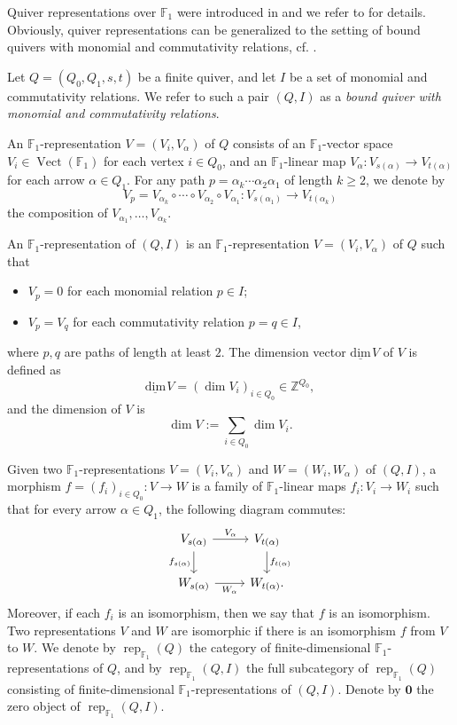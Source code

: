 \documentclass[12pt]{amsart}
\theoremstyle{remark}
\theoremstyle{definition}
\numberwithin{equation}{section}
\newcommand{\dimv}{\underline{\mathrm{dim}}\hspace{1pt}}
\begin{document}
Quiver representations over $\mathbb{F}_1$ were introduced in \cite{Sz12} and we refer to \cite{Sz12} for details. Obviously, quiver representations can be generalized to the setting of bound quivers with monomial and commutativity relations, cf. \cite{TF25}. 

Let $Q=(Q_0,Q_1,s,t)$ be a finite quiver, and let $I$ be a set of monomial and commutativity relations. We refer to such a pair $(Q,I)$ as a {\em bound quiver with monomial and commutativity relations}.

 An $\mathbb{F}_1$-representation
${V}=(V_i,V_\alpha)$
of $Q$ consists of an $\mathbb{F}_1$-vector space $V_i\in \operatorname{Vect} (\mathbb{F}_1)$ for each vertex $i\in Q_0$, and an $\mathbb{F}_1$-linear map
$V_\alpha:V_{s(\alpha)}\to V_{t(\alpha)}$
for each arrow $\alpha\in Q_1$. For any path $p=\alpha_k\cdots \alpha_2\alpha_1$ of length $k\geq 2$, we denote by 
\[
V_p=V_{\alpha_k}\circ\cdots\circ V_{\alpha_2}\circ V_{\alpha_1}:V_{s(\alpha_1)}\to V_{t(\alpha_k)}
\]
the composition of $V_{\alpha_1},\ldots, V_{\alpha_k}$.

 An $\mathbb{F}_1$-representation
of $(Q,I)$ is an $\mathbb{F}_1$-representation ${V}=(V_i,V_\alpha)$ of $Q$
such that
\begin{itemize}
    \item $V_p=0$ for each monomial relation $p\in I$;
    \item $V_p=V_q$ for each commutativity relation $p=q\in I$,
\end{itemize}
where $p,q$ are paths of length at least $2$. The dimension vector $\dimv {V}$ of ${V}$ is defined as
\[
\dimv {V}=(\dim V_i)_{i\in Q_0}\in \mathbb{Z}^{Q_0},
\]
and the dimension of ${V}$ is
\[\dim {V}:=\sum_{i\in Q_0}\dim V_i.\]



Given two $\mathbb{F}_1$-representations ${V}=(V_i,V_\alpha)$ and ${W}=(W_i,W_\alpha)$ of $(Q,I)$, a morphism $f=(f_i)_{i\in Q_0}:{V}\to {W}$ is a family of $\mathbb{F}_1$-linear maps $f_i:V_i\to W_i$ such that for every arrow $\alpha\in Q_1$, the following diagram commutes:
\[
\begin{tikzcd}
V_{s(\alpha)} \arrow[r,"V_\alpha"] \arrow[d,"f_{s(\alpha)}"'] 
& V_{t(\alpha)} \arrow[d,"f_{t(\alpha)}"] \\
W_{s(\alpha)} \arrow[r,"W_\alpha"'] 
& W_{t(\alpha)}.
\end{tikzcd}
\]
Moreover, if each $f_i$ is an isomorphism, then we say that $f$ is an isomorphism. Two representations ${V}$ and ${W}$ are isomorphic if there is an isomorphism $f$ from ${V}$ to ${W}$.
We denote by $\operatorname{rep}_{\mathbb{F}_1}(Q)$ the category of finite-dimensional $\mathbb{F}_1$-representations of $Q$, and  by $\operatorname{rep}_{\mathbb{F}_1}(Q,I)$
the full subcategory of $\operatorname{rep}_{\mathbb{F}_1}(Q)$ consisting of finite-dimensional $\mathbb{F}_1$-representations of $(Q,I)$. Denote by $\mathbf{0}$ the zero object of $\operatorname{rep}_{\mathbb{F}_1}(Q,I)$.
\end{document}
